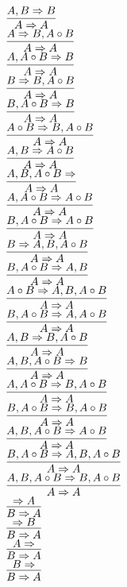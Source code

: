 \documentclass[11pt]{article}
\begin{document}
\begin{center}
\bigskip
\\$\infer{A\Rightarrow A}{A, B\Rightarrow B}$
\bigskip
\\$\infer{A\Rightarrow A}{A\Rightarrow B, A\circ B}$
\bigskip
\\$\infer{A\Rightarrow A}{A, A\circ B\Rightarrow B}$
\bigskip
\\$\infer{A\Rightarrow A}{B\Rightarrow B, A\circ B}$
\bigskip
\\$\infer{A\Rightarrow A}{B, A\circ B\Rightarrow B}$
\bigskip
\\$\infer{A\Rightarrow A}{A\circ B\Rightarrow B, A\circ B}$
\bigskip
\\$\infer{A\Rightarrow A}{A, B\Rightarrow A\circ B}$
\bigskip
\\$\infer{A\Rightarrow A}{A, B, A\circ B\Rightarrow }$
\bigskip
\\$\infer{A\Rightarrow A}{A, A\circ B\Rightarrow A\circ B}$
\bigskip
\\$\infer{A\Rightarrow A}{B, A\circ B\Rightarrow A\circ B}$
\bigskip
\\$\infer{A\Rightarrow A}{B\Rightarrow A, B, A\circ B}$
\bigskip
\\$\infer{A\Rightarrow A}{B, A\circ B\Rightarrow A, B}$
\bigskip
\\$\infer{A\Rightarrow A}{A\circ B\Rightarrow A, B, A\circ B}$
\bigskip
\\$\infer{A\Rightarrow A}{B, A\circ B\Rightarrow A, A\circ B}$
\bigskip
\\$\infer{A\Rightarrow A}{A, B\Rightarrow B, A\circ B}$
\bigskip
\\$\infer{A\Rightarrow A}{A, B, A\circ B\Rightarrow B}$
\bigskip
\\$\infer{A\Rightarrow A}{A, A\circ B\Rightarrow B, A\circ B}$
\bigskip
\\$\infer{A\Rightarrow A}{B, A\circ B\Rightarrow B, A\circ B}$
\bigskip
\\$\infer{A\Rightarrow A}{A, B, A\circ B\Rightarrow A\circ B}$
\bigskip
\\$\infer{A\Rightarrow A}{B, A\circ B\Rightarrow A, B, A\circ B}$
\bigskip
\\$\infer{A\Rightarrow A}{A, B, A\circ B\Rightarrow B, A\circ B}$
\bigskip
\\$\infer{B\Rightarrow A}{\Rightarrow A}$
\bigskip
\\$\infer{B\Rightarrow A}{\Rightarrow B}$
\bigskip
\\$\infer{B\Rightarrow A}{A\Rightarrow }$
\bigskip
\\$\infer{B\Rightarrow A}{B\Rightarrow }$

\end{center}
\end{document}
